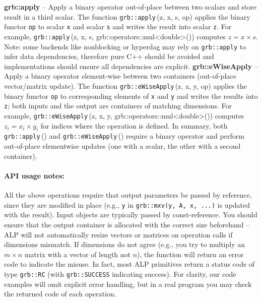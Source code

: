       \textbf{grb::apply} – Apply a binary operator out-of-place between two scalars and store result in a third scalar. 
      The function \texttt{grb::apply}\,(z, x, s, op) applies the binary functor \texttt{op} to scalar \texttt{x} 
      and scalar \texttt{s} and writes the result into scalar \texttt{z}. 
      For example, \texttt{grb::apply}\,(z, x, s, grb::operators::mul<double>()) computes $z = x \times s$. 
      Note: some backends like nonblocking or hyperdag may rely on \texttt{grb::apply} to infer data dependencies,
      therefore pure C++ should be avoided and implementations should ensure all dependencies are explicit.
\newline
      \textbf{grb::eWiseApply} – Apply a binary operator element-wise between two containers (out-of-place vector/matrix update). 
      The function \texttt{grb::eWiseApply}\,(z, x, y, op) applies the binary functor \texttt{op} to corresponding elements of \texttt{x} and \texttt{y} and writes the results into \texttt{z}; both inputs and the output are containers of matching dimensions. 
      For example, \texttt{grb::eWiseApply}\,(z, x, y, grb::operators::mul<double>()) computes $z_i = x_i \times y_i$ for indices where the operation is defined. 
      In summary, both \texttt{grb::apply}\,() and \texttt{grb::eWiseApply}\,() require a binary operator and perform out-of-place elementwise updates (one with a scalar, the other with a second container).

\paragraph{API usage notes:} All the above operations require that output parameters be passed by reference, since they are modified in place (e.g., \texttt{y} in \texttt{grb::mxv(y, A, x, ...)} is updated with the result). Input objects are typically passed by const-reference. You should ensure that the output container is allocated with the correct size beforehand – ALP will not automatically resize vectors or matrices on operation calls if dimensions mismatch. If dimensions do not agree (e.g., you try to multiply an $m\times n$ matrix with a vector of length not $n$), 
the function will return an error code to indicate the misuse. In fact, most ALP primitives return a status code of type \texttt{grb::RC} (with \texttt{grb::SUCCESS} indicating success). For clarity, our code examples will omit explicit error handling, but in a real program you may check the returned code of each operation.


